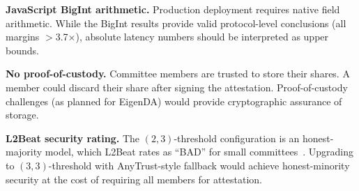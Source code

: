 \textbf{JavaScript BigInt arithmetic.} Production deployment requires native
field arithmetic. While the BigInt results provide valid protocol-level
conclusions (all margins $>$3.7$\times$), absolute latency numbers should be
interpreted as upper bounds.

\textbf{No proof-of-custody.} Committee members are trusted to store their
shares. A member could discard their share after signing the attestation.
Proof-of-custody challenges (as planned for EigenDA) would provide
cryptographic assurance of storage.

\textbf{L2Beat security rating.} The $(2,3)$-threshold configuration is an
honest-majority model, which L2Beat rates as ``BAD'' for small
committees~\cite{l2beat2024da}. Upgrading to $(3,3)$-threshold with
AnyTrust-style fallback would achieve honest-minority security at the cost
of requiring all members for attestation.
